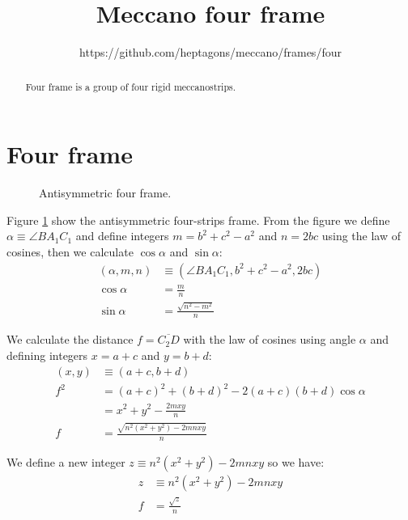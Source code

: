 \documentclass[11pt]{article}
\title{\textbf{Meccano four frame}}
\author{https://github.com/heptagons/meccano/frames/four}
\date{}
\begin{document}
\maketitle
\begin{abstract}
Four frame is a group of four rigid meccano\meccanoref strips.
\end{abstract}

\section{Four frame}

\begin{figure}[H]
 \centering
 \caption{Antisymmetric four frame.}
 \label{fig:four}
\end{figure}

Figure \ref{fig:four} show the antisymmetric four-strips frame.
From the figure we define $\alpha \equiv \angle{BA_1C_1}$ and define integers $m=b^2 + c^2 - a^2$ and $n=2bc$ using the law of cosines, then we calculate $\cos\alpha$ and $\sin\alpha$:
\begin{align}
(\alpha,m,n) &\equiv (\angle{BA_1C_1},b^2 + c^2 - a^2, 2bc) \label{eq:mn}\\
\cos\alpha &= \frac{m}n\\
\sin\alpha &= \frac{\sqrt{n^2-m^2}}n
\end{align}

We calculate the distance $f = \overline{C_2D}$ with the law of cosines using angle $\alpha$
and defining integers $x = a+c$ and $y = b+d$:
\begin{align}
(x, y) &\equiv (a + c, b + d) \label{eq:xy}\\
f^2 &= (a+c)^2 + (b+d)^2 - 2(a+c)(b+d)\cos\alpha\\
 &= x^2 + y^2 - \frac{2mxy}n\\
f &= \frac{\sqrt{n^2(x^2 + y^2) - 2mnxy}}n
\end{align}

We define a new integer $z \equiv n^2(x^2 + y^2) - 2mnxy$ so we have:
\begin{align}
z &\equiv n^2(x^2 + y^2) - 2mnxy\\
f &= \frac{\sqrt{z}}n
\end{align}
\end{document}
